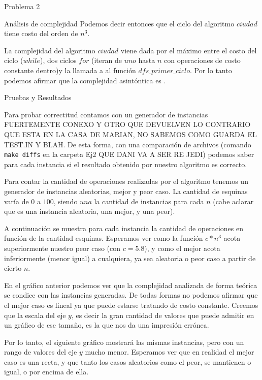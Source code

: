 \begin{section}{Problema 2}
\begin{subsection}{Análisis de complejidad}
		Podemos decir entonces que el ciclo del algoritmo $ciudad$ tiene costo del orden de $n^3$.

		La complejidad del algoritmo $ciudad$ viene dada por el máximo entre el costo del ciclo ($while$), dos ciclos $for$ (iteran de $uno$ hasta $n$ con operaciones de costo constante dentro)y la llamada a al función $dfs\_primer\_ciclo$. Por lo tanto podemos afirmar que la complejidad asintóntica es .
	\end{subsection}

	\begin{subsection}{Pruebas y Resultados}
	
		Para probar correctitud contamos con un generador de instancias FUERTEMENTE CONEXO Y OTRO QUE DEVUELVEN LO CONTRARIO QUE ESTA EN LA CASA DE MARIAN, NO SABEMOS COMO GUARDA EL TEST.IN Y BLAH. De esta forma, con una comparación de archivos (comando \texttt{make diffs} en la carpeta Ej2 QUE DANI VA A SER RE JEDI) podemos saber para cada instancia si el resultado obtenido por nuestro algoritmo es correcto.

		Para contar la cantidad de operaciones realizadas por el algoritmo tenemos un generador de instancias aleatorias, mejor y peor caso. La cantidad de esquinas varía de $0$ a $100$, siendo $una$ la cantidad de instancias para cada $n$ (cabe aclarar que es una instancia aleatoria, una mejor, y una peor).

		A continuación se muestra para cada instancia la cantidad de operaciones en función de la cantidad esquinas. Esperamos ver como la función $c*n^3$ acota superiormente nuestro peor caso (con $c=5.8$), y como el mejor acota inferiormente (menor igual) a cualquiera, ya sea aleatoria o peor caso a partir de cierto $n$.


		En el gráfico anterior podemos ver que la complejidad analizada de forma teórica se condice con las instancias generadas. De todas formas no podemos afirmar que el mejor caso es lineal ya que puede estarse tratando de costo constante. Creemos que la escala del eje $y$, es decir la gran cantidad de valores que puede admitir en un gráfico de ese tamaño, es la que nos da una impresión errónea.

		Por lo tanto, el siguiente gráfico mostrará las mismas instancias, pero con un rango de valores del eje $y$ mucho menor. Esperamos ver que en realidad el mejor caso es una recta, y que tanto los casos aleatorios como el peor, se mantienen o igual, o por encima de ella.


\end{subsection}
\end{section}
